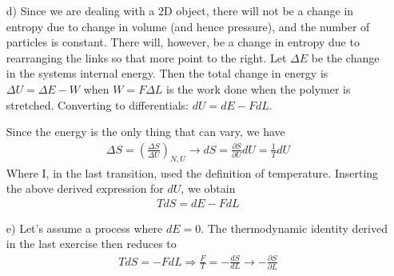 \documentclass[11pt]{article}
\newcounter{excount}
\newenvironment{exercise}[1][]{\addtocounter{excount}{1} \noindent {\bf Exercise
    \arabic{excount} #1}\hspace{2mm}}{\vspace{4mm}}
\begin{document}
\begin{exercise}
\begin{itemize}
		
		
		
		\item[d)]
			Since we are dealing with a 2D object, there will not be a change in entropy due to change in volume (and hence pressure), and the number of particles is constant. There will, however, be a change in entropy due to rearranging the links so that more point to the right. Let $\Delta E$ be the change in the systems internal energy. Then the total change in energy is $\Delta U = \Delta E - W$ when $W=F\Delta L$ is the work done when the polymer is stretched. Converting to differentials: $dU = dE - FdL$.
			
			Since the energy is the only thing that can vary, we have
			\begin{align*}
				\Delta S = \left( \frac{\Delta S}{\Delta U} \right) _{N,U} \rightarrow dS = \frac{\partial S}{\partial U} d U = \frac{1}{T}dU
			\end{align*}
			Where I, in the last transition, used the definition of temperature. Inserting the above derived expression for $dU$, we obtain
			\begin{align*}
				TdS = dE - FdL
			\end{align*}
		
		
		
		
		\item[e)]
			Let's assume a process where $dE = 0$. The thermodynamic identity derived in the last exercise then reduces to
			\begin{align*}
				TdS = -FdL \Rightarrow \frac{F}{T} = -\frac{dS}{dL} \rightarrow  -\frac{\partial S}{\partial L}
			\end{align*}
		

\end{itemize}
\end{exercise}
\end{document}
